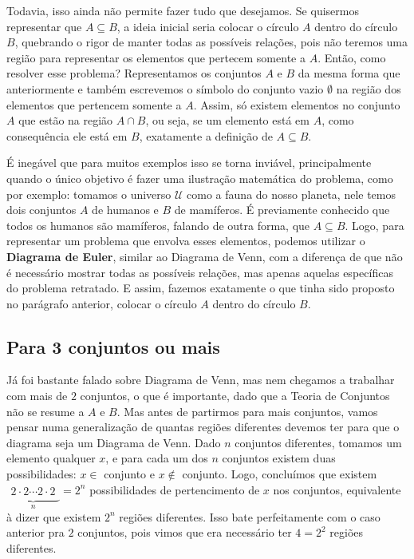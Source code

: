 Todavia, isso ainda não permite fazer tudo que desejamos. Se quisermos representar que $A \subseteq B$, a ideia inicial seria colocar o círculo $A$ dentro do círculo $B$, quebrando o rigor de manter todas as possíveis relações, pois não teremos uma região para representar os elementos que pertecem somente a $A$. Então, como resolver esse problema? Representamos os conjuntos $A$ e $B$ da mesma forma que anteriormente e também escrevemos o símbolo do conjunto vazio $\emptyset$ na região dos elementos que pertencem somente a $A$. Assim, só existem elementos no conjunto $A$ que estão na região $A\cap B$, ou seja, se um elemento está em $A$, como consequência ele está em $B$, exatamente a definição de $A \subseteq B$.


É inegável que para muitos exemplos isso se torna inviável, principalmente quando o único objetivo é fazer uma ilustração matemática do problema, como por exemplo: tomamos o universo $\mathcal U$ como a fauna do nosso planeta, nele temos dois conjuntos $A$ de humanos e $B$ de mamíferos. É previamente conhecido que todos os humanos são mamíferos, falando de outra forma, que $A \subseteq B$. Logo, para representar um problema que envolva esses elementos, podemos utilizar o \textbf{Diagrama de Euler}, similar ao Diagrama de Venn, com a diferença de que não é necessário mostrar todas as possíveis relações, mas apenas aquelas específicas do problema retratado. E assim, fazemos exatamente o que tinha sido proposto no parágrafo anterior, colocar o círculo $A$ dentro do círculo $B$.


\subsection{Para 3 conjuntos ou mais}
Já foi bastante falado sobre Diagrama de Venn, mas nem chegamos a trabalhar com mais de $2$ conjuntos, o que é importante, dado que a Teoria de Conjuntos não se resume a $A$ e $B$. Mas antes de partirmos para mais conjuntos, vamos pensar numa generalização de quantas regiões diferentes devemos ter para que o diagrama seja um Diagrama de Venn. Dado $n$ conjuntos diferentes, tomamos um elemento qualquer $x$, e para cada um dos $n$ conjuntos existem duas possibilidades: $x \in $ conjunto e $x \notin $ conjunto. Logo, concluímos que existem $\underbrace{\begin{matrix} 2\cdot2\cdots2\cdot2\end{matrix}}_{n} = 2^n$ possibilidades de pertencimento de $x$ nos conjuntos, equivalente à dizer que existem $2^n$ regiões diferentes. Isso bate perfeitamente com o caso anterior pra $2$ conjuntos, pois vimos que era necessário ter $4=2^2$ regiões diferentes.

